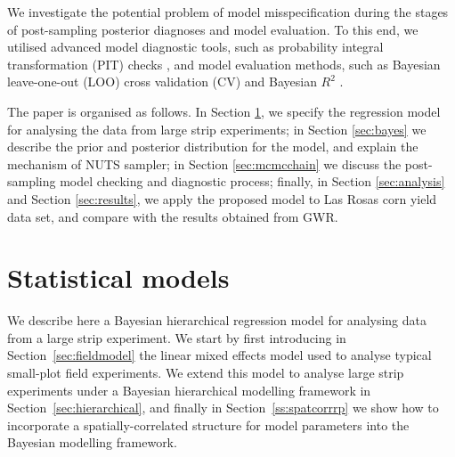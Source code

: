 \documentclass[a4paper]{article}   	%
\begin{document}
	
	We investigate the potential problem of model misspecification during the stages of post-sampling posterior diagnoses and model evaluation. To this end, we utilised advanced model diagnostic tools, such as probability integral transformation (PIT) checks \parencite{gabry2019Visualization}, and model evaluation methods, such as Bayesian leave-one-out (LOO) cross validation (CV)  \parencite{Vehtari2017Practical} and Bayesian $R^2$ \parencite{Gelman2019Rsquared}. 
	
	
	The paper is organised as follows. In Section \ref{sec:model}, we specify the regression model for analysing the data from large strip experiments; in Section \ref{sec:bayes} we describe the prior and posterior distribution for the model, and explain the mechanism of NUTS sampler; in Section \ref{sec:mcmcchain} we discuss the post-sampling model checking and diagnostic process; finally, in Section \ref{sec:analysis} and Section \ref{sec:results}, we apply the proposed model to Las Rosas corn yield data set, and compare with the results obtained from GWR.
	
	
	
	
	\section{Statistical models}\label{sec:model}
	
	
	
	We describe here a Bayesian hierarchical regression model for analysing data from a large strip experiment. We start by first introducing in Section~\ref{sec:fieldmodel} the linear mixed effects model used to analyse typical small-plot field experiments. We extend this model to analyse large strip experiments under a Bayesian hierarchical modelling framework in Section~\ref{sec:hierarchical}, and finally in Section~\ref{ss:spatcorrrp} we show how to incorporate a spatially-correlated structure for model parameters into the Bayesian modelling framework.
	
\end{document}
